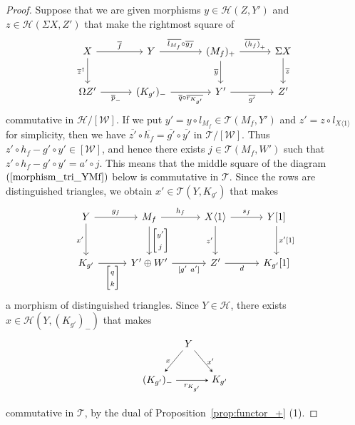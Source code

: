 \documentclass[a4paper,reqno,10pt]{amsart}
\theoremstyle{definition}
\theoremstyle{definition}
\theoremstyle{definition}
\theoremstyle{definition}
\theoremstyle{plain}
\newcommand{\CH}{\mathcal{H}}
\newcommand{\CT}{\mathcal{T}}
\newcommand{\CW}{\mathcal{W}}
\begin{document}
\begin{proof}
Suppose that we are given morphisms $y\in \CH(Z,Y')$ and $z\in \CH(\Sigma X,Z')$ that make the rightmost square of
\[
\begin{tikzcd}[row sep=0.8cm, column sep=1.1cm]
X
\arrow{r}{\overline{f}}
\arrow[d, swap, "\overline{z}^{\dagger}"]
&Y
\arrow{r}{\overline{l_{M_f}}\circ \overline{g_f}}
&(M_f)_+
\arrow{r}{\overline{(h_f)}_+}
\arrow[d, swap, "\overline{y}"]
&\Sigma X 
\arrow[d, "\overline{z}"]
\\
\Omega Z'
\arrow{r}[swap]{\overline{p}_-}
&(K_{g'})_-
\arrow{r}[swap]{\overline{q}\circ \overline{r_{K_{g'}}}}
&Y' 
\arrow{r}[swap]{\overline{g'}}
&Z'
\end{tikzcd}
\]
commutative in $\CH/[\CW]$. 
If we put $y'=y\circ l_{M_f}\in\CT(M_f,Y')$ and $z'=z\circ l_{X\langle1\rangle}$ for simplicity, then we have 
\color{blue}
$\overline{z'}\circ \overline{h_f}=\overline{g'}\circ\overline{y'}$
\normalcolor
in $\CT/[\CW]$. Thus $z'\circ h_f-g'\circ y'\in[\CW]$, and hence there exists $j\in\CT(M_f,W')$ such that
$z'\circ h_f-g'\circ y'=a'\circ j$. 
This means that the middle square of the diagram $(\ref{morphism_tri_YMf})$ below is commutative in $\CT$. 
Since the rows are distinguished triangles, we obtain $x'\in\CT(Y,K_{g'})$ that makes 
\begin{equation}\label{morphism_tri_YMf}
\begin{tikzcd}[row sep=1.0cm, column sep=1.0cm]
Y
\arrow{r}{g_f}
\arrow[d, swap, "x'"]
&M_f
\arrow{r}{h_f}
\arrow{d}{{\begin{bmatrix}y'\\ j\end{bmatrix}}}
&X\langle1\rangle
\arrow{r}{s_f}
\arrow[d, swap, "z'"]
&Y[1]
\arrow[d, "x'{[}1{]}"]
\\
K_{g'}
\arrow{r}[swap]{{\begin{bmatrix}q\\ k\end{bmatrix}}}
&Y'\oplus W'
\arrow{r}[swap]{{[}g'\ a'{]}}
&Z' 
\arrow{r}[swap]{d}
&K_{g'}{[}1{]}
\end{tikzcd}
\end{equation}
a morphism of distinguished triangles.
\normalcolor
Since $Y\in\CH$, there exists $x\in\CH(Y,(K_{g'})_-)$ that makes 
\[
\begin{tikzpicture}[>=stealth]
\node (1) at (0,0.8) {$Y$};
\node (2) at (1.1,-0.5) {$K_{g'}$};
\node (3) at (-1.1,-0.5) {$(K_{g'})_-$};
\draw[->] (1) -- node[right,font=\scriptsize] {$x'$} (2);
\draw[->] (1) -- node[left,font=\scriptsize] {$x$} (3);
\draw[->] (3) -- node[below,font=\scriptsize] {$r_{K_{g'}}$} (2);
\end{tikzpicture}
\]
commutative in $\CT$, by the dual of Proposition~\ref{prop:functor_+} {\rm (1)}.


\end{proof}
\end{document}
